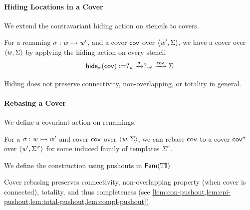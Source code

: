 \paragraph{Hiding Locations in a Cover}

We extend the contravariant hiding action on stencils to covers.
\begin{definition}
For a renaming $\sigma : \mathit{w} \rightarrowtail \mathit{w}'$, and a cover $\mathsf{cov}$ over $\langle\mathit{w}', \Sigma\rangle$, we have a cover over $\langle\mathit{w}, \Sigma\rangle$
by applying the hiding action on every stencil
\[ \mathsf{hide}_\sigma(\mathsf{cov}) := ?_{\mathit{w}} \xrightarrow{\sigma} ?_{\mathit{w}'} \xrightarrow {\mathsf{cov}} \Sigma \]
\end{definition}
Hiding does not preserve connectivity, non-overlapping, or totality in general.

\paragraph{Rebasing a Cover}\label{sec:cov-rebase}

We define a covariant action on renamings.

\begin{definition}
For a $\sigma : \mathit{w} \rightarrowtail \mathit{w}'$ and cover $\mathsf{cov}$ over $\langle\mathit{w}, \Sigma\rangle$,
we can rebase $\mathsf{cov}$ to a cover $\mathsf{cov}^\sigma$ over $\langle\mathit{w}', \Sigma^\sigma\rangle$ for some induced family of templates ${\Sigma^\sigma}$.

We define the construction using pushouts in $\mathsf{Fam}({{\mathbb{T}\mathbb{I}}})$
\begin{center}
\end{center}
\end{definition}

Cover rebasing preserves connectivity, non-overlapping property (when cover is connected), totality, and thus completeness (see \cref{lem:con-pushout,lem:epi-pushout,lem:total-pushout,lem:compl-pushout}).


